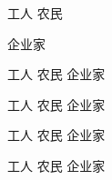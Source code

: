 \documentclass{article}
\begin{document}
{\yahei 工人}
农民

企业家


\songti 工人 农民 企业家

\heiti 工人 农民 企业家

\kaishu 工人 农民 企业家

\youyuan 工人 农民 企业家
\end{document}
